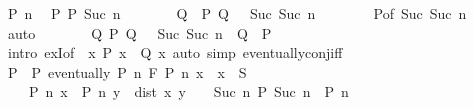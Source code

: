 \begin{isabellebody}
\ P\ n\ \isamarkupfalse%
\ {\isachardoublequoteopen}{\isacharquery}{\kern0pt}P\ P\ {\isacharparenleft}{\kern0pt}{}{\isacharslash}{\kern0pt}Suc\ n{\isacharparenright}{\kern0pt}{\isachardoublequoteclose}\isanewline
\ \ \ \ \isamarkupfalse%
\ \isamarkupfalse%
\ Q\ \ {\isachardoublequoteopen}{\isacharquery}{\kern0pt}P\ Q\ {\isacharparenleft}{\kern0pt}{}\ {\isacharslash}{\kern0pt}\ Suc\ {\isacharparenleft}{\kern0pt}Suc\ n{\isacharparenright}{\kern0pt}{\isacharparenright}{\kern0pt}{\isachardoublequoteclose}\isanewline
\ \ \ \ \ \ \isamarkupfalse%
\ P{\isacharbrackleft}{\kern0pt}of\ {\isachardoublequoteopen}{}{\isacharslash}{\kern0pt}Suc\ {\isacharparenleft}{\kern0pt}Suc\ n{\isacharparenright}{\kern0pt}{\isachardoublequoteclose}{\isacharbrackright}{\kern0pt}\ \isamarkupfalse%
\ auto\isanewline
\ \ \ \ \isamarkupfalse%
\ \isamarkupfalse%
\ {\isachardoublequoteopen}{\isasymexists}Q{\isachardot}{\kern0pt}\ {\isacharquery}{\kern0pt}P\ Q\ {\isacharparenleft}{\kern0pt}{}\ {\isacharslash}{\kern0pt}\ Suc\ {\isacharparenleft}{\kern0pt}Suc\ n{\isacharparenright}{\kern0pt}{\isacharparenright}{\kern0pt}\ {\isasymand}\ Q\ {\isasymle}\ P{\isachardoublequoteclose}\isanewline
\ \ \ \ \ \ \isamarkupfalse%
\ {\isacharparenleft}{\kern0pt}intro\ exI{\isacharbrackleft}{\kern0pt}of\ {\isacharunderscore}{\kern0pt}\ {\isachardoublequoteopen}{\isasymlambda}x{\isachardot}{\kern0pt}\ P\ x\ {\isasymand}\ Q\ x{\isachardoublequoteclose}{\isacharbrackright}{\kern0pt}{\isacharparenright}{\kern0pt}\ {\isacharparenleft}{\kern0pt}auto\ simp{\isacharcolon}{\kern0pt}\ eventually{\isacharunderscore}{\kern0pt}conj{\isacharunderscore}{\kern0pt}iff{\isacharparenright}{\kern0pt}\isanewline
\ \ \isamarkupfalse%
\isanewline
\ \ \isamarkupfalse%
\ \isamarkupfalse%
\ P\ \ P{\isacharcolon}{\kern0pt}\ {\isachardoublequoteopen}eventually\ {\isacharparenleft}{\kern0pt}P\ n{\isacharparenright}{\kern0pt}\ F{\isachardoublequoteclose}\ {\isachardoublequoteopen}P\ n\ x\ {\isasymLongrightarrow}\ x\ {\isasymin}\ S{\isachardoublequoteclose}\isanewline
\ \ \ \ {\isachardoublequoteopen}P\ n\ x\ {\isasymLongrightarrow}\ P\ n\ y\ {\isasymLongrightarrow}\ dist\ x\ y\ {\isacharless}{\kern0pt}\ {}\ {\isacharslash}{\kern0pt}\ Suc\ n{\isachardoublequoteclose}\ {\isachardoublequoteopen}P\ {\isacharparenleft}{\kern0pt}Suc\ n{\isacharparenright}{\kern0pt}\ {\isasymle}\ P\ n{\isachardoublequoteclose}\isanewline

\end{isabellebody}
